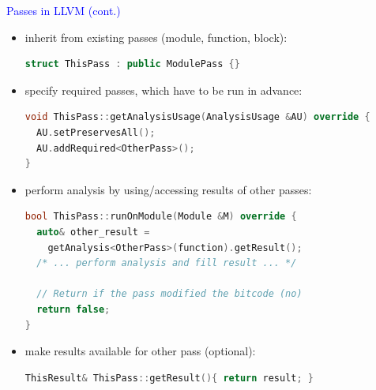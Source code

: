 \begin{frame}[fragile]{\textcolor{blue}{Passes in LLVM (cont.)}}
\underline{}
\begin{itemize}
\item inherit from existing passes (module, function, block):
\begin{footnotesize}
\begin{lstlisting}[language=C++]
struct ThisPass : public ModulePass {}
\end{lstlisting}
\end{footnotesize}

\item specify required passes, which have to be run in advance:
\begin{footnotesize}
\begin{lstlisting}[language=C++]
void ThisPass::getAnalysisUsage(AnalysisUsage &AU) override {
  AU.setPreservesAll();
  AU.addRequired<OtherPass>();
}
\end{lstlisting}
\end{footnotesize}

\item perform analysis by using/accessing results of other passes:
\begin{footnotesize}
\begin{lstlisting}[language=C++]
bool ThisPass::runOnModule(Module &M) override {
  auto& other_result =  
    getAnalysis<OtherPass>(function).getResult();
  /* ... perform analysis and fill result ... */
  
  // Return if the pass modified the bitcode (no)
  return false;
}
\end{lstlisting}
\end{footnotesize}

\item make results available for other pass (optional): 
\begin{footnotesize}
\begin{lstlisting}[language=C++]  
ThisResult& ThisPass::getResult(){ return result; }
\end{lstlisting}
\end{footnotesize}

\end{itemize}

\end{frame}
